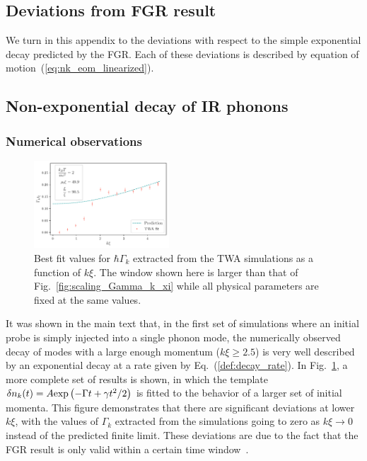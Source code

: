 \documentclass[aps,prd,notitlepage,amsfonts,amssymb,amsmath,nofootinbib,superscriptaddress,longbibliography]{revtex4-2}
\begin{document}
\begin{appendices}
\section{Deviations from FGR result} 
\label{app:deviations}

We turn in this appendix to the deviations with respect to the simple exponential decay predicted by the FGR.  Each of these deviations is described by equation of motion~(\ref{eq:nk_eom_linearized}).


\subsection{Non-exponential decay of IR phonons}
\label{subsubsec:non_exp_decay}


\subsubsection{Numerical observations}

\begin{figure}
    \centering
    \includegraphics[width=0.45\textwidth]{fig7.pdf}
    \caption{Best fit values for $\hbar \Gamma_k$ extracted from the TWA simulations as a function of $k \xi$. The window shown here is larger than that of Fig.~\ref{fig:scaling_Gamma_k_xi} while all physical parameters are fixed at the same values.
    \label{fig:scaling_Gamma_k_xi_small_and_large}}
\end{figure}

It was shown in the main text that, in the first set of simulations where an initial probe is simply injected into a single phonon mode, the numerically observed decay of modes with a large enough momentum ($k\xi \geq 2.5$) is very well described by an exponential decay at a rate given by Eq.~(\ref{def:decay_rate}). In Fig.~\ref{fig:scaling_Gamma_k_xi_small_and_large}, a more complete set of results is shown, in which the template $\delta n_{k}(t) = A {\rm exp}\left(-\Gamma t + \gamma t^{2}/2\right)$ is fitted to the behavior of a larger set of initial momenta.  This figure demonstrates that there are significant deviations at lower $k\xi$, with the values of $\Gamma_{k}$ extracted from the simulations going to zero as $k\xi \to 0$ instead of the predicted finite limit. These deviations are due to the fact that the FGR result is only valid within a certain time window~\cite{CohenTannoudji2020,Peres1980}.



\end{appendices}
\end{document}
